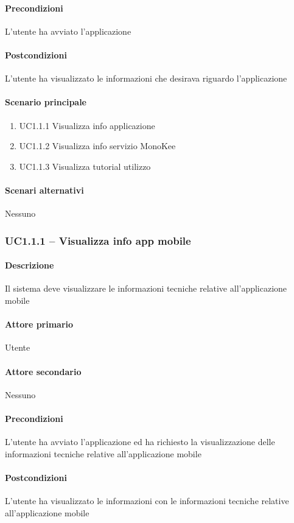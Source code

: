 \paragraph{Precondizioni}  L’utente ha avviato l’applicazione
\paragraph{Postcondizioni}  L’utente ha visualizzato le informazioni che desirava riguardo l’applicazione
\paragraph{Scenario principale}  
    \begin{enumerate}
        \item UC1.1.1 Visualizza info applicazione
        \item UC1.1.2 Visualizza info servizio MonoKee
        \item UC1.1.3 Visualizza tutorial utilizzo
    \end{enumerate}
\paragraph{Scenari alternativi}  Nessuno


\subsubsection{UC1.1.1 – Visualizza info app mobile}
\paragraph{Descrizione}  Il sistema deve visualizzare le informazioni tecniche relative all’applicazione mobile
\paragraph{Attore primario}  Utente
\paragraph{Attore secondario}  Nessuno
\paragraph{Precondizioni}  L’utente ha avviato l’applicazione ed ha richiesto la visualizzazione delle informazioni tecniche relative all’applicazione mobile
\paragraph{Postcondizioni}  L’utente ha visualizzato le informazioni con le informazioni tecniche relative all’applicazione mobile
